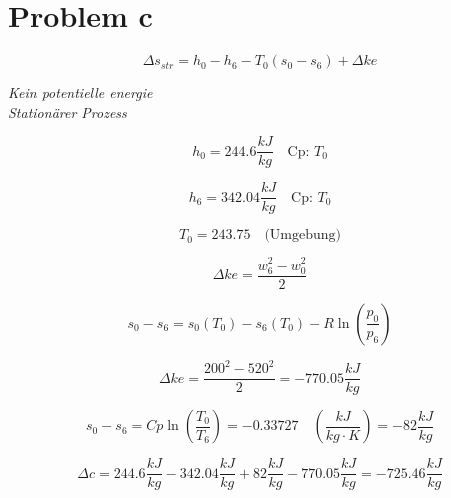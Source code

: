 \section*{Problem c}

\[
\Delta s_{str} = h_0 - h_6 - T_0 (s_0 - s_6) + \Delta ke
\]

\textit{Kein potentielle energie} \\
\textit{Stationärer Prozess}

\[
h_0 = 244.6 \frac{kJ}{kg} \quad \text{Cp: } T_0
\]

\[
h_6 = 342.04 \frac{kJ}{kg} \quad \text{Cp: } T_0
\]

\[
T_0 = 243.75 \quad \text{(Umgebung)}
\]

\[
\Delta ke = \frac{w_6^2 - w_0^2}{2}
\]

\[
s_0 - s_6 = s_0 (T_0) - s_6 (T_0) - R \ln \left( \frac{p_0}{p_6} \right)
\]

\[
\Delta ke = \frac{200^2 - 520^2}{2} = -770.05 \frac{kJ}{kg}
\]

\[
s_0 - s_6 = Cp \ln \left( \frac{T_0}{T_6} \right) = -0.33727 \quad \left( \frac{kJ}{kg \cdot K} \right) = -82 \frac{kJ}{kg}
\]

\[
\Delta c = 244.6 \frac{kJ}{kg} - 342.04 \frac{kJ}{kg} + 82 \frac{kJ}{kg} - 770.05 \frac{kJ}{kg} = -725.46 \frac{kJ}{kg}
\]